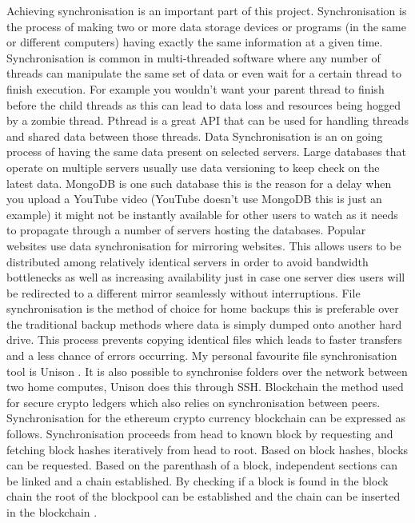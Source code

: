 Achieving synchronisation \cite{sync} is an important part of this project. 
Synchronisation is the process of making two or more data storage devices or programs (in the same or different computers) having exactly the same information at a given time.
Synchronisation is common in multi-threaded software where any number of threads can manipulate the same set of data or even wait for a certain thread to finish execution. For example you wouldn't want your parent thread to finish before the child threads as this can lead to data loss and resources being hogged by a zombie thread. Pthread \cite{pthread} is a great API that can be used for handling threads and shared data between those threads. 
Data Synchronisation \cite{datasync} is an on going process of having the same data present on selected servers. Large databases that operate on multiple servers usually use data versioning to keep check on the latest data. MongoDB is one such database \cite{mongo} this is the reason for a delay when you upload a YouTube video (YouTube doesn't use MongoDB this is just an example) it might not be instantly available for other users to watch as it needs to propagate through a number of servers hosting the databases.
Popular websites use data synchronisation for mirroring websites. This allows users to be distributed among relatively identical servers in order to avoid bandwidth bottlenecks as well as increasing availability just in case one server dies users will be redirected to a different mirror seamlessly without interruptions. 
File synchronisation is the method of choice for home backups this is preferable over the traditional backup methods where data is simply dumped onto another hard drive. This process prevents copying identical files which leads to faster transfers and a less chance of errors occurring. My personal favourite file synchronisation tool is Unison \cite{unison}. It is also possible to synchronise folders over the network between two home computes, Unison does this through SSH.
Blockchain \cite{blockChain} the method used for secure crypto ledgers which also relies on synchronisation between peers. Synchronisation for the ethereum crypto currency blockchain can be expressed as follows. Synchronisation proceeds from head to known block by requesting and fetching block hashes iteratively from head to root. Based on block hashes, blocks can be requested. Based on the parenthash of a block, independent sections can be linked and a chain established. By checking if a block is found in the block chain the root of the blockpool can be established and the chain can be inserted in the blockchain \cite{blockChain}.
%                                                   
%
%
%
%
%
%
%
%
%
%
%
%
%

